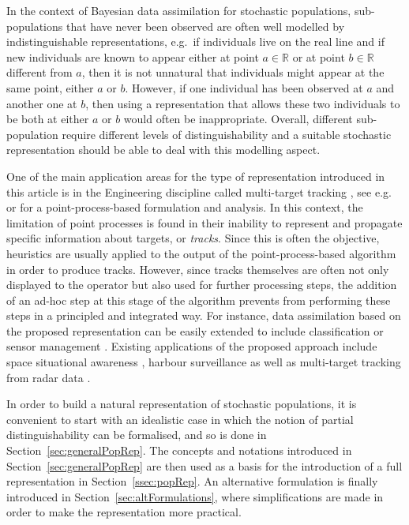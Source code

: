 \documentclass{aptpub}
\numberwithin{equation}{section}
\begin{document}
\begin{example}
In the context of Bayesian data assimilation for stochastic populations, sub-populations that have never been observed are often well modelled by indistinguishable representations, e.g.\ if individuals live on the real line and if new individuals are known to appear either at point $a \in {\mathbb{R}}$ or at point $b \in {\mathbb{R}}$ different from $a$, then it is not unnatural that individuals might appear at the same point, either $a$ or $b$. However, if one individual has been observed at $a$ and another one at $b$, then using a representation that allows these two individuals to be both at either $a$ or $b$ would often be inappropriate. Overall, different sub-population require different levels of distinguishability and a suitable stochastic representation should be able to deal with this modelling aspect.
\end{example}

One of the main application areas for the type of representation introduced in this article is in the Engineering discipline called multi-target tracking \cite{Blackman1986,Mahler2007}, see e.g.\ \cite{Caron2011,Pace2013,DelMoral2015} or \cite[Chapt.~6]{DelMoral2013} for a point-process-based formulation and analysis. In this context, the limitation of point processes is found in their inability to represent and propagate specific information about targets, or \emph{tracks}. Since this is often the objective, heuristics are usually applied to the output of the point-process-based algorithm in order to produce tracks. However, since tracks themselves are often not only displayed to the operator but also used for further processing steps, the addition of an ad-hoc step at this stage of the algorithm prevents from performing these steps in a principled and integrated way. For instance, data assimilation based on the proposed representation can be easily extended to include classification \cite{Pailhas2016} or sensor management \cite{Delande2014_SensorControl}. Existing applications of the proposed approach include space situational awareness \cite{Delande2016_Space}, harbour surveillance \cite{Pailhas2016} as well as multi-target tracking from radar data \cite{Houssineau2015_SMC}.

In order to build a natural representation of stochastic populations, it is convenient to start with an idealistic case in which the notion of partial distinguishability can be formalised, and so is done in Section~\ref{sec:generalPopRep}. The concepts and notations introduced in Section~\ref{sec:generalPopRep} are then used as a basis for the introduction of a full representation in Section~\ref{ssec:popRep}. An alternative formulation is finally introduced in Section~\ref{sec:altFormulations}, where simplifications are made in order to make the representation more practical.
\end{document}
